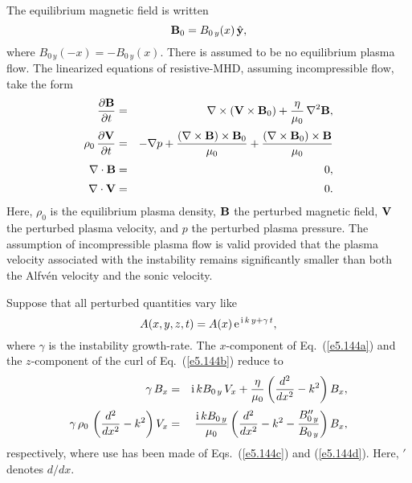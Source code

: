 The equilibrium magnetic field is written
\begin{equation}
{\bf B}_0 = B_{0\,y}(x)\,\hat{\bf y},
\end{equation}
where $B_{0\,y}(-x)=-B_{0\,y}(x)$. 
There is assumed to be no equilibrium plasma flow. The linearized
equations of resistive-MHD, assuming incompressible flow, take the form
\begin{eqnarray}\label{e5.144a}
\frac{\partial {\bf B}}{\partial t} &=& \nabla\times({\bf V}\times{\bf B}_0)
+ \frac{\eta}{\mu_0}\,\nabla^2{\bf B},\\[0.5ex]\label{e5.144b}
\rho_0\,\frac{\partial{\bf V}}{\partial t} &=& -\nabla p + 
\frac{(\nabla\times{\bf B})\times{\bf B}_0}{\mu_0} + 
\frac{(\nabla\times{\bf B}_0)\times{\bf B}}{\mu_0}\\[0.5ex]\label{e5.144c}
\nabla\cdot{\bf B} &=& 0,\\[0.5ex]
\nabla\cdot{\bf V} &=& 0.\label{e5.144d}
\end{eqnarray}
Here, $\rho_0$ is the equilibrium plasma density, ${\bf B}$  the
perturbed magnetic field, ${\bf V}$  the perturbed plasma velocity, and
$p$  the perturbed plasma pressure. The assumption of incompressible
plasma flow is valid provided that the plasma velocity associated with the
instability remains significantly
smaller than both the Alfv\'{e}n velocity and the sonic velocity. 

Suppose that all perturbed quantities vary like
\begin{equation}
A(x,y,z,t) = A(x)\,{\rm e}^{\,{\rm i}\,k\,y +\gamma\,t},
\end{equation}
where $\gamma$ is the instability growth-rate. The $x$-component of
Eq.~(\ref{e5.144a}) and the $z$-component of the curl of Eq.~(\ref{e5.144b})
reduce to
\begin{eqnarray}\label{e5.146a}
\gamma\,B_x &=& {\rm i}\,kB_{0\,y} \,V_x + \frac{\eta}{\mu_0}
\left(\frac{d^2}{dx^2} - k^2\right) B_x,\\[0.5ex]\label{e5.146b}
\gamma\,\rho_0\,\left(\frac{d^2}{dx^2}-k^2\right) V_x
&=& \frac{{\rm i}\,kB_{0\,y}}{\mu_0}\left(
\frac{d^2}{dx^2} - k^2 - \frac{B_{0\,y}''}{B_{0\,y}}\right) B_x,
\end{eqnarray}
respectively, where use has been made of Eqs.~(\ref{e5.144c}) and (\ref{e5.144d}).
Here, $'$ denotes $d/dx$.

